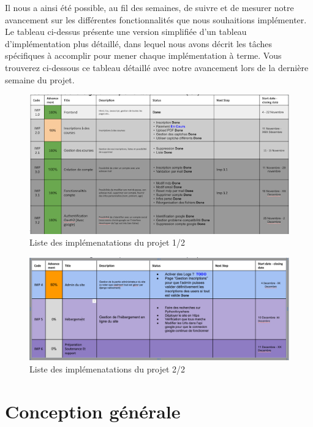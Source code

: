 \documentclass[12pt]{article} %
\begin{document}
	Il nous a ainsi été possible, au fil des semaines, de suivre et de mesurer notre avancement sur les différentes fonctionnalités que nous souhaitions implémenter. Le tableau ci-dessus présente une version simplifiée d'un tableau d'implémentation plus détaillé, dans lequel nous avons décrit les tâches spécifiques à accomplir pour mener chaque implémentation à terme. Vous trouverez ci-dessous ce tableau détaillé avec notre avancement lors de la dernière semaine du projet.
	

	\begin{figure}[!h]
	\begin{center}
		\includegraphics[scale=0.75]{images/implementation1}
		\caption{Liste des implémenatations du projet 1/2}
	\end{center}
	\end{figure}
	\begin{figure}[!h]
	\begin{center}
		\includegraphics[scale=0.25]{images/implementation2}
		\caption{Liste des implémenatations du projet 2/2}
	\end{center}
	\end{figure}

	
	
	
\section{Conception générale}
\end{document}

